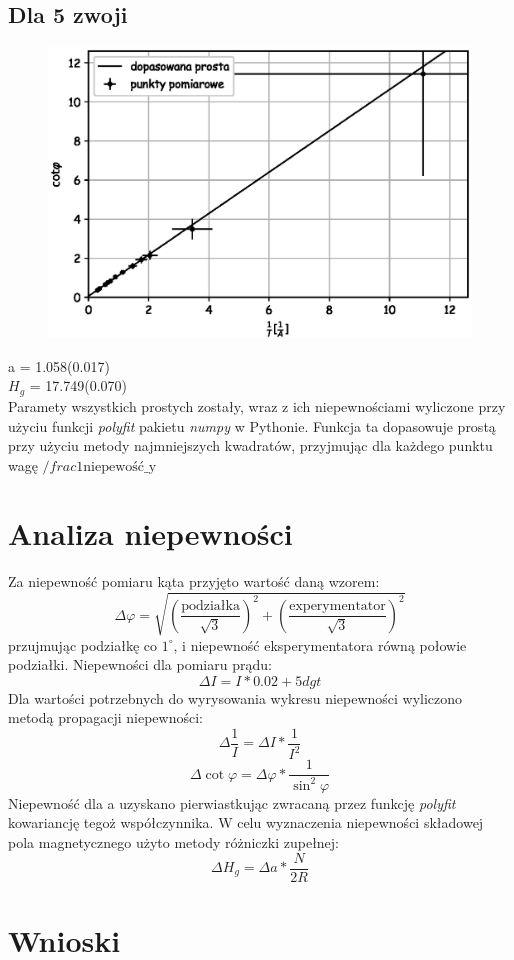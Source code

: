 \documentclass[a4paper,10pt]{article}
\begin{document}
\subsection{Dla 5 zwoji}

\begin{figure}[H]
  \includegraphics{./wykres_5.eps}
  \caption{}
  \label{}
\end{figure}
a = 1.058(0.017)\\
$H_g$ = 17.749(0.070)\\
Paramety wszystkich prostych zostały, wraz z ich niepewnościami wyliczone przy użyciu funkcji \emph{polyfit} pakietu \emph{numpy} w Pythonie. Funkcja ta
dopasowuje prostą przy użyciu metody najmniejszych kwadratów, przyjmując dla każdego punktu wagę $/frac{1}{\text{niepewość_y}}$

\section{Analiza niepewności}
Za niepewność pomiaru kąta przyjęto wartość daną wzorem:
\begin{equation}
  \Delta \varphi = \sqrt{(\frac{\text{podziałka}}{\sqrt{3}})^2+(\frac{\text{experymentator}}{\sqrt{3}})^2}
\end{equation}
przujmując podziałkę co $1^\circ$, i niepewność eksperymentatora równą połowie podziałki.
Niepewności dla pomiaru prądu:
\begin{equation}
  \Delta I = I*0.02+5dgt
\end{equation}
Dla wartości potrzebnych do wyrysowania wykresu niepewności wyliczono metodą propagacji niepewności:\\
\begin{equation}
  \Delta \frac{1}{I} = \Delta I * \frac{1}{I^2}
\end{equation}
\begin{equation}
  \Delta \cot{\varphi} = \Delta \varphi * \frac{1}{\sin^2{\varphi}}
\end{equation}
Niepewność dla a uzyskano pierwiastkując zwracaną przez funkcję \emph{polyfit} kowariancję tegoż współczynnika. W celu wyznaczenia niepewności składowej pola
magnetycznego użyto %
metody różniczki zupełnej:
\begin{equation}
  \Delta H_g = \Delta a * \frac{N}{2R}%
\end{equation}
\section{Wnioski}
\end{document}
